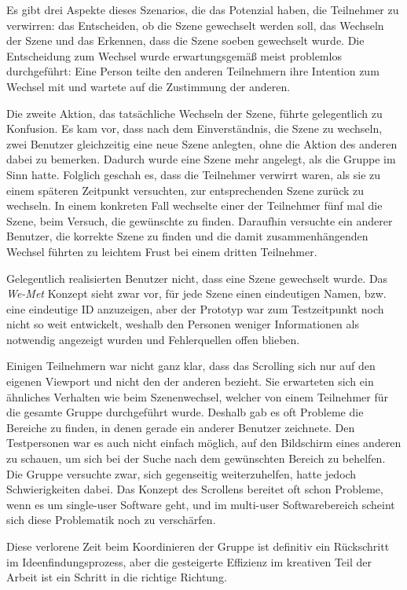 \medskip Es gibt drei Aspekte dieses Szenarios, die das Potenzial haben, die Teilnehmer zu verwirren: das Entscheiden, ob die Szene gewechselt werden soll, das Wechseln der Szene und das Erkennen, dass die Szene soeben gewechselt wurde. Die Entscheidung zum Wechsel wurde erwartungsgemäß meist problemlos durchgeführt: Eine Person teilte den anderen Teilnehmern ihre Intention zum Wechsel mit und wartete auf die Zustimmung der anderen.
	
\medskip Die zweite Aktion, das tatsächliche Wechseln der Szene, führte gelegentlich zu Konfusion. Es kam vor, dass nach dem Einverständnis, die Szene zu wechseln, zwei Benutzer gleichzeitig eine neue Szene anlegten, ohne die Aktion des anderen dabei zu bemerken. Dadurch wurde eine Szene mehr angelegt, als die Gruppe im Sinn hatte. Folglich geschah es, dass die Teilnehmer verwirrt waren, als sie zu einem späteren Zeitpunkt versuchten, zur entsprechenden Szene zurück zu wechseln. In einem konkreten Fall wechselte einer der Teilnehmer fünf mal die Szene, beim Versuch, die gewünschte zu finden. Daraufhin versuchte ein anderer Benutzer, die korrekte Szene zu finden und die damit zusammenhängenden Wechsel führten zu leichtem Frust bei einem dritten Teilnehmer.
	
\medskip Gelegentlich realisierten Benutzer nicht, dass eine Szene gewechselt wurde. Das \emph{We-Met} Konzept sieht zwar vor, für jede Szene einen eindeutigen Namen, bzw. eine eindeutige ID anzuzeigen, aber der Prototyp war zum Testzeitpunkt noch nicht so weit entwickelt, weshalb den Personen weniger Informationen als notwendig angezeigt wurden und Fehlerquellen offen blieben.
	
\medskip Einigen Teilnehmern war nicht ganz klar, dass das Scrolling sich nur auf den eigenen Viewport und nicht den der anderen bezieht. Sie erwarteten sich ein ähnliches Verhalten wie beim Szenenwechsel, welcher von einem Teilnehmer für die gesamte Gruppe durchgeführt wurde. Deshalb gab es oft Probleme die Bereiche zu finden, in denen gerade ein anderer Benutzer zeichnete. Den Testpersonen war es auch nicht einfach möglich, auf den Bildschirm eines anderen zu schauen, um sich bei der Suche nach dem gewünschten Bereich zu behelfen. Die Gruppe versuchte zwar, sich gegenseitig weiterzuhelfen, hatte jedoch Schwierigkeiten dabei. Das Konzept des Scrollens bereitet oft schon Probleme, wenn es um single-user Software geht, und im multi-user Softwarebereich scheint sich diese Problematik noch zu verschärfen.
	
\medskip Diese verlorene Zeit beim Koordinieren der Gruppe ist definitiv ein Rückschritt im Ideenfindungsprozess, aber die gesteigerte Effizienz im kreativen Teil der Arbeit ist ein Schritt in die richtige Richtung.

